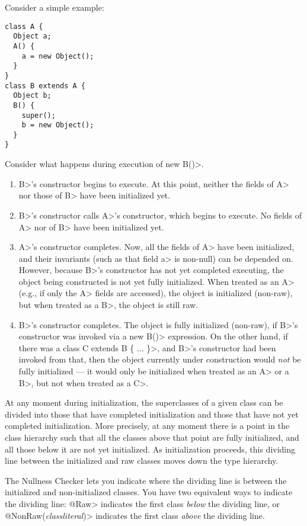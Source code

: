 Consider a simple example:

\begin{Verbatim}
class A {
  Object a;
  A() {
    a = new Object();
  }
}
class B extends A {
  Object b;
  B() {
    super();
    b = new Object();
  }
}
\end{Verbatim}

Consider what happens during execution of \<new B()>.

\begin{enumerate}
\item \<B>'s constructor begins to execute.  At this point, neither the
  fields of \<A> nor those of \<B> have been initialized yet.
\item \<B>'s constructor calls \<A>'s constructor, which begins to execute.
  No fields of \<A> nor of \<B> have been initialized yet.
\item \<A>'s constructor completes.  Now, all the fields of \<A> have been
  initialized, and their invariants (such as that field \<a> is non-null) can be
  depended on.  However, because \<B>'s constructor has not yet completed
  executing, the object being constructed is not yet fully initialized.
  When treated as an \<A> (e.g., if only the \<A> fields are accessed), the
  object is initialized (non-raw), but when treated as a \<B>, the object
  is still raw.
\item \<B>'s constructor completes.  The object is fully initialized
  (non-raw), if \<B>'s constructor was invoked via a \<new B()>
  expression.  On the other hand, if there was a \<class C extends B \{
  ... \}>, and \<B>'s constructor had been invoked from that, then the
  object currently under construction would \emph{not} be fully initialized
  --- it would only be initialized when treated as an \<A> or a \<B>, but
  not when treated as a \<C>.
\end{enumerate}

At any moment during initialization, the superclasses of a given class
can be divided into those that have completed initialization and those that
have not yet completed initialization.  More precisely, at any moment there
is a point in the class hierarchy such that all the classes above that
point are fully initialized, and all those below it are not yet
initialized.  As initialization proceeds, this dividing line between the
initialized and raw classes moves down the type hierarchy.

The Nullness Checker lets you indicate where the dividing line is between
the initialized and non-initialized classes.
You have two equivalent ways to indicate the dividing line:  \<@Raw>
indicates the first class \emph{below} the dividing line, or
\<@NonRaw(\emph{classliteral})> indicates the first class \emph{above} the
dividing line.

